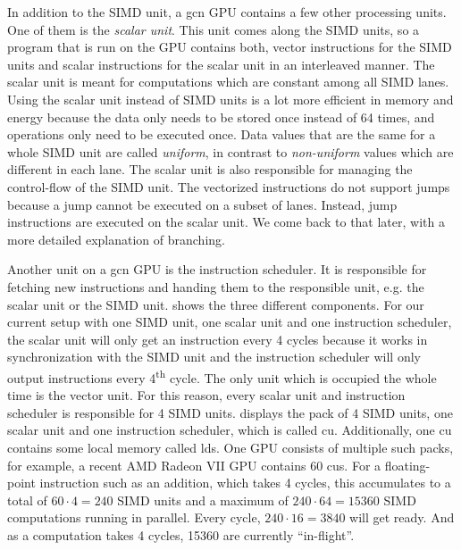 In addition to the SIMD unit, a \gls{gcn} GPU contains a few other processing units. One of them is the \emph{scalar unit}. This unit comes along the SIMD units, so a program that is run on the GPU contains both, vector instructions for the SIMD units and scalar instructions for the scalar unit in an interleaved manner. The scalar unit is meant for computations which are constant among all SIMD lanes.
Using the scalar unit instead of SIMD units is a lot more efficient in memory and energy because the data only needs to be stored once instead of 64 times, and operations only need to be executed once.
Data values that are the same for a whole SIMD unit are called \emph{uniform}, in contrast to \emph{non-uniform} values which are different in each lane. The scalar unit is also responsible for managing the control-flow of the SIMD unit. The vectorized instructions do not support jumps because a jump cannot be executed on a subset of lanes. Instead, jump instructions are executed on the scalar unit. We come back to that later, with a more detailed explanation of branching.



Another unit on a \gls{gcn} GPU is the instruction scheduler. It is responsible for fetching new instructions and handing them to the responsible unit, e.g. the scalar unit or the SIMD unit.  shows the three different components. For our current setup with one SIMD unit, one scalar unit and one instruction scheduler, the scalar unit will only get an instruction every 4 cycles because it works in synchronization with the SIMD unit and the instruction scheduler will only output instructions every 4\textsuperscript{th} cycle. The only unit which is occupied the whole time is the vector unit. For this reason, every scalar unit and instruction scheduler is responsible for 4 SIMD units.  displays the pack of 4 SIMD units, one scalar unit and one instruction scheduler, which is called \gls{cu}. Additionally, one \gls{cu} contains some local memory called \gls{lds}. One GPU consists of multiple such packs, for example, a recent AMD Radeon VII GPU contains 60 \glspl{cu}. For a floating-point instruction such as an addition, which takes 4 cycles, this accumulates to a total of $60 \cdot 4 = 240$ SIMD units and a maximum of $240 \cdot 64 = 15360$ SIMD computations running in parallel. Every cycle, $240 \cdot 16 = 3840$ will get ready. And as a computation takes 4 cycles, 15360 are currently \enquote{in-flight}.

